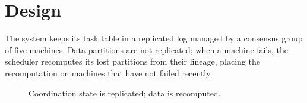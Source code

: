 \chapter{Design}
\label{ch:design}

The system keeps its task table in a replicated log managed by a consensus group of five
machines. Data partitions are not replicated; when a machine fails, the scheduler recomputes
its lost partitions from their lineage, placing the recomputation on machines that have not
failed recently.

\begin{figure}[htbp]
  \centering
  \caption{Coordination state is replicated; data is recomputed.}
  \label{fig:design}
\end{figure}
